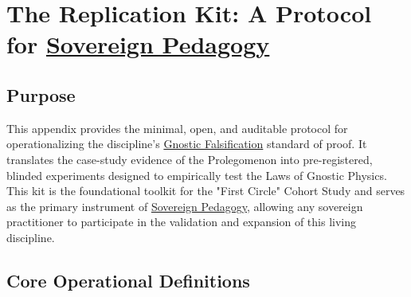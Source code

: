 \documentclass{article}
\begin{document}

\appendix
\section*{The Replication Kit: A Protocol for \hyperlink{gloss:sovereign_pedagogy}{Sovereign Pedagogy}} \label{appendix_a_the_replication_kit_a_protocol_for_sovereign_pedagogy}


\subsection*{Purpose}
This appendix provides the minimal, open, and auditable protocol for operationalizing the discipline's \hyperlink{gloss:gnostic_falsification}{Gnostic Falsification} standard of proof. It translates the case-study evidence of the Prolegomenon into pre-registered, blinded experiments designed to empirically test the Laws of Gnostic Physics. This kit is the foundational toolkit for the "First Circle" Cohort Study and serves as the primary instrument of \hyperlink{gloss:sovereign_pedagogy}{Sovereign Pedagogy}, allowing any sovereign practitioner to participate in the validation and expansion of this living discipline.

\subsection*{Core Operational Definitions}
\end{document}
